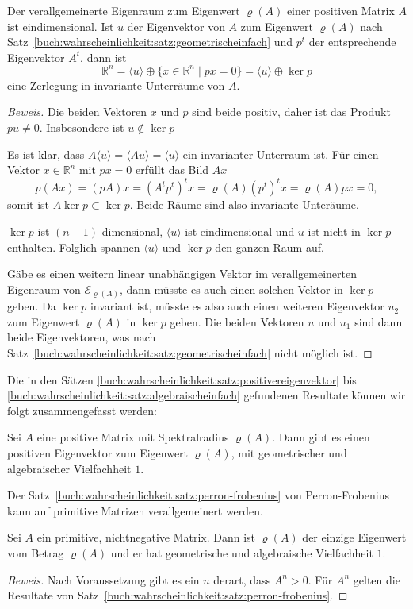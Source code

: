 \begin{satz}
\label{buch:wahrscheinlichkeit:satz:algebraischeinfach}
Der verallgemeinerte Eigenraum zum Eigenwert $\varrho(A)$ einer 
positiven Matrix $A$ ist eindimensional.
Ist $u$ der Eigenvektor von $A$ zum Eigenwert $\varrho(A)$ nach
Satz~\ref{buch:wahrscheinlichkeit:satz:geometrischeinfach}
und $p^t$ der entsprechende Eigenvektor $A^t$, dann
ist
\[
\mathbb{R}^n
=
\langle u\rangle
\oplus
\{ x\in\mathbb{R}^n\;|\; px=0\}
=
\langle u\rangle
\oplus
\ker p
\]
eine Zerlegung in invariante Unterräume von $A$.
\end{satz}

\begin{proof}[Beweis]
Die beiden Vektoren $x$ und $p$ sind beide positiv, daher ist das 
Produkt $pu\ne 0$.
Insbesondere ist $u\not\in\ker p$

Es ist klar, dass $A\langle u\rangle = \langle Au\rangle = \langle u\rangle$
ein invarianter Unterraum ist.
Für einen Vektor $x\in\mathbb{R}^n$ mit $px=0$ erfüllt das Bild $Ax$
\[
p(Ax)=(pA)x=(A^tp^t)^tx=
\varrho(A)(p^t)^tx
=
\varrho(A)px = 0,
\]
somit ist $A\ker p \subset \ker p$.
Beide Räume sind also invariante Unteräume.

$\ker p$ ist $(n-1)$-dimensional, $\langle u\rangle$ ist eindimensional
und $u$ ist nicht in $\ker p$ enthalten.
Folglich spannen $\langle u\rangle$ und $\ker p$ den ganzen Raum auf.

Gäbe es einen weitern linear unabhängigen Vektor im verallgemeinerten
Eigenraum von $\mathcal{E}_{\varrho(A)}$, dann müsste es auch einen
solchen Vektor in $\ker p$ geben.
Da $\ker p$ invariant ist, müsste es also auch einen weiteren Eigenvektor
$u_2$ zum Eigenwert $\varrho(A)$ in $\ker p$ geben.
Die beiden Vektoren $u$ und $u_1$ sind dann beide Eigenvektoren, was
nach Satz~\ref{buch:wahrscheinlichkeit:satz:geometrischeinfach}
nicht möglich ist.
\end{proof}

Die in den Sätzen
\ref{buch:wahrscheinlichkeit:satz:positivereigenvektor}
bis
\ref{buch:wahrscheinlichkeit:satz:algebraischeinfach}
gefundenen Resultate können wir folgt zusammengefasst werden:

\begin{satz}
\label{buch:wahrscheinlichkeit:satz:perron-frobenius}
Sei $A$ eine positive Matrix mit Spektralradius $\varrho(A)$.
Dann gibt es einen positiven Eigenvektor zum Eigenwert $\varrho(A)$,
mit geometrischer und algebraischer Vielfachheit $1$.
\end{satz}

Der Satz~\ref{buch:wahrscheinlichkeit:satz:perron-frobenius}
von Perron-Frobenius kann auf primitive Matrizen verallgemeinert
werden.

\begin{satz}
Sei $A$ ein primitive, nichtnegative Matrix.
Dann ist $\varrho(A)$ der einzige Eigenwert vom Betrag $\varrho(A)$
und er hat geometrische und algebraische Vielfachheit $1$.
\end{satz}

\begin{proof}[Beweis]
Nach Voraussetzung gibt es ein $n$ derart, dass $A^n>0$.
Für $A^n$ gelten die Resultate von 
Satz~\ref{buch:wahrscheinlichkeit:satz:perron-frobenius}.
\end{proof}
